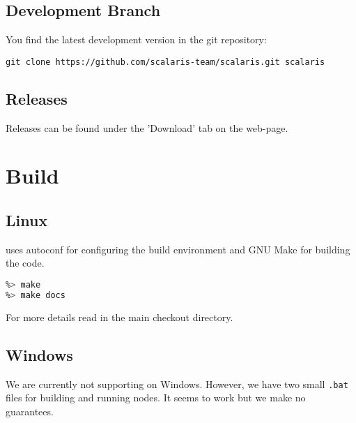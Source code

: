 \subsection{Development Branch}

You find the latest development version in the git repository:
\begin{lstlisting}[language={}]
git clone https://github.com/scalaris-team/scalaris.git scalaris
\end{lstlisting}

\subsection{Releases}

Releases can be found under the 'Download' tab on the web-page.


\section{Build}

\subsection{Linux}

\scalaris{} uses autoconf for configuring the build environment and
GNU Make for building the code.

\begin{lstlisting}[language=sh]
%> ./configure
%> make
%> make docs
\end{lstlisting}

For more details read  in the main \scalaris{} checkout
directory.

\subsection{Windows}

We are currently not supporting \scalaris{} on Windows. However, we
have two small {\tt .bat} files for building and running \scalaris{}
nodes. It seems to work but we make no guarantees.

